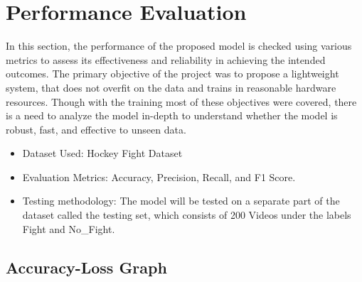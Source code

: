 \section{Performance Evaluation}

In this section, the performance of the proposed model is checked using various metrics to assess its effectiveness and reliability in achieving the intended outcomes. The primary objective of the project was to propose a lightweight system, that does not overfit on the data and trains in reasonable hardware resources. Though with the training most of these objectives were covered, there is a need to analyze the model in-depth to understand whether the model is robust, fast, and effective to unseen data.

\begin{itemize}
    \item Dataset Used: Hockey Fight Dataset

    \item Evaluation Metrics: Accuracy, Precision, Recall, and F1 Score.

    \item Testing methodology: The model will be tested on a separate part of the dataset called the testing set, which consists of 200 Videos under the labels Fight and No\_Fight.
\end{itemize}



\clearpage

\subsection{Accuracy-Loss Graph}

